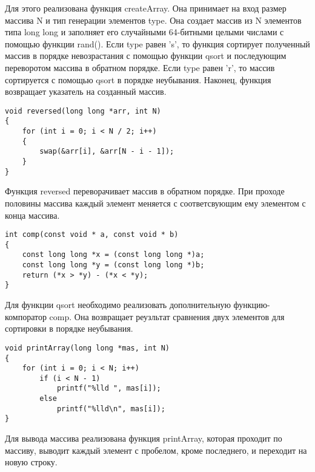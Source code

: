 \documentclass[a4paper,12pt,titlepage,finall]{article}
\begin{document}
Для этого реализована функция createArray. Она принимает на вход размер массива N и тип генерации элементов type. Она создает массив из N элементов типа long long и заполняет его случайными 64-битными целыми числами с помощью функции rand(). Если type равен 's', то функция сортирует полученный массив в порядке невозрастания с помощью функции qsort и последующим переворотом массива в обратном порядке. Если type равен 'r', то массив сортируется с помощью qsort в порядке неубывания. Наконец, функция возвращает указатель на созданный массив.\par

\lstset{language=c}
\begin{lstlisting}
void reversed(long long *arr, int N)
{
    for (int i = 0; i < N / 2; i++)
    {
        swap(&arr[i], &arr[N - i - 1]);
    }
}
\end{lstlisting} \par

Функция reversed переворачивает массив в обратном порядке. При проходе половины массива каждый элемент меняется с соответсвующим ему элементом с конца массива.\par

\lstset{language=c}
\begin{lstlisting}
int comp(const void * a, const void * b)
{
    const long long *x = (const long long *)a;
    const long long *y = (const long long *)b;
    return (*x > *y) - (*x < *y);
}
\end{lstlisting} \par

Для функции qsort необходимо реализовать дополнительную функцию-компоратор comp. Она возвращает реузльтат сравнения двух элементов для сортировки в порядке неубывания. \par

\lstset{language=c}
\begin{lstlisting}
void printArray(long long *mas, int N)
{
    for (int i = 0; i < N; i++)
        if (i < N - 1)
            printf("%lld ", mas[i]);
        else
            printf("%lld\n", mas[i]);
}

\end{lstlisting} \par

Для вывода массива реализована функция printArray, которая проходит по массиву, выводит каждый элемент с пробелом, кроме последнего, и переходит на новую строку. \par

\newpage
\end{document}

